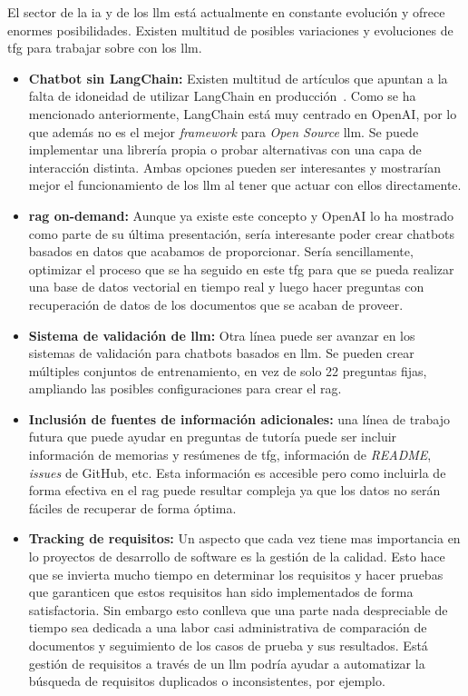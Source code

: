 El sector de la \acrlong{ia} y de los \acrlong{llm} está actualmente en constante evolución y ofrece enormes posibilidades. Existen multitud de posibles variaciones y evoluciones de \acrshort{tfg} para trabajar sobre con los \acrshort{llm}.

\begin{itemize}
    \item \textbf{Chatbot sin LangChain:} Existen multitud de artículos que apuntan a la falta de idoneidad de utilizar LangChain en producción~\cite{LangChainNot}. Como se ha mencionado anteriormente, LangChain está muy centrado en OpenAI, por lo que además no es el mejor \textit{framework} para \textit{Open Source} \acrshort{llm}. Se puede implementar una librería propia o probar alternativas con una capa de interacción distinta. Ambas opciones pueden ser interesantes y mostrarían mejor el funcionamiento de los \acrshort{llm} al tener que actuar con ellos directamente.

    \item \textbf{\acrshort{rag} on-demand:} Aunque ya existe este concepto y OpenAI lo ha mostrado como parte de su última presentación, sería interesante poder crear chatbots basados en datos que acabamos de proporcionar. Sería sencillamente, optimizar el proceso que se ha seguido en este \acrshort{tfg} para que se pueda realizar una base de datos vectorial en tiempo real y luego hacer preguntas con recuperación de datos de los documentos que se acaban de proveer.

    \item \textbf{Sistema de validación de \acrshort{llm}:} Otra  línea puede ser avanzar en los sistemas de validación para chatbots basados en \acrshort{llm}. Se pueden crear múltiples conjuntos de entrenamiento, en vez de solo 22 preguntas fijas, ampliando las posibles configuraciones para crear el \acrshort{rag}.

    \item \textbf{Inclusión de fuentes de información adicionales:} una línea de trabajo futura que puede ayudar en preguntas de tutoría puede ser incluir información de memorias y resúmenes de \acrshort{tfg}, información de \textit{README}, \textit{issues} de GitHub, etc. Esta información es accesible pero como incluirla de forma efectiva en el \acrshort{rag} puede resultar compleja ya que los datos no serán fáciles de recuperar de forma óptima.      

    \item \textbf{Tracking de requisitos:} Un aspecto que cada vez tiene mas importancia en lo proyectos de desarrollo de software es la gestión de la calidad. Esto hace que se invierta mucho tiempo en determinar los requisitos y hacer pruebas que garanticen que estos requisitos han sido implementados de forma satisfactoria. Sin embargo esto conlleva que una parte nada despreciable de tiempo sea dedicada a una labor casi administrativa de comparación de documentos y seguimiento de los casos de prueba y sus resultados. Está gestión de requisitos a través de un \acrshort{llm} podría ayudar a automatizar la búsqueda de requisitos duplicados o inconsistentes, por ejemplo.


\end{itemize}

